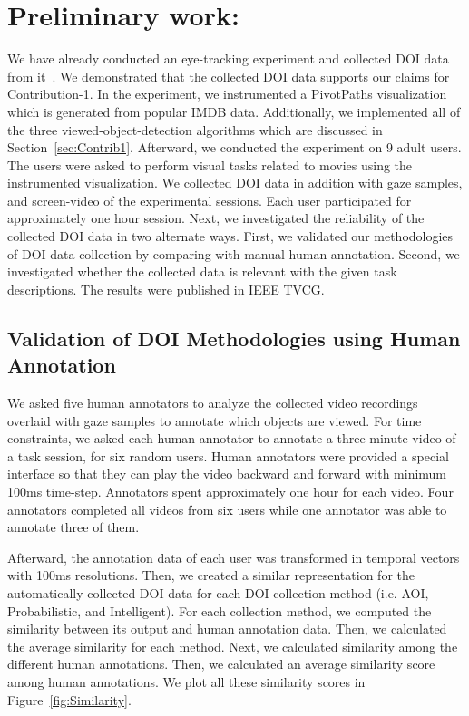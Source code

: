 \chapter{Preliminary work:}
We have already conducted an eye-tracking experiment and collected DOI data from it~\cite{Ala16}. We demonstrated that the collected DOI data supports our claims for Contribution-1. In the experiment, we instrumented a PivotPaths visualization which is generated from popular IMDB data. Additionally, we implemented all of the three viewed-object-detection algorithms which are discussed in Section~\ref{sec:Contrib1}. Afterward, we conducted the experiment on 9 adult users. The users were asked to perform visual tasks related to movies using the instrumented visualization. We collected DOI data in addition with gaze samples, and screen-video of the experimental sessions. Each user participated for approximately one hour session. Next, we investigated the reliability of the collected DOI data in two alternate ways. First, we validated our methodologies of DOI data collection by comparing with manual human annotation. Second, we investigated whether the collected data is relevant with the given task descriptions. The results were published in IEEE TVCG. 

\section{Validation of DOI Methodologies using Human Annotation}
We asked five human annotators to analyze the collected video recordings overlaid with gaze samples to annotate which objects are viewed. For time constraints, we asked each human annotator to annotate a three-minute video of a task session, for six random users. Human annotators were provided a special interface so that they can play the video backward and forward with minimum 100ms time-step. Annotators spent approximately one hour for each video. Four annotators completed all videos from six users while one annotator was able to annotate three of them. 

Afterward, the annotation data of each user was transformed in temporal vectors with 100ms resolutions. Then, we created a similar representation for the automatically collected DOI data for each DOI collection method (i.e. AOI, Probabilistic, and Intelligent).  For each collection method, we computed the similarity between its output and human annotation data. Then, we calculated the average similarity for each method. Next, we calculated similarity among the different human annotations. Then, we calculated an average similarity score among human annotations. We plot all these similarity scores in Figure~\ref{fig:Similarity}. 

